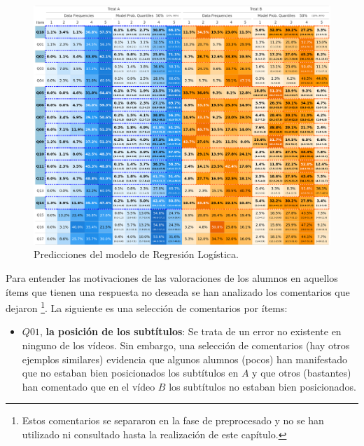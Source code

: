 \documentclass[
  12pt,
  a4paper,
  extrafontsizes,
  onecolumn,
  openright,
  table]{memoir}
\providecommand{\tightlist}{%
  \setlength{\itemsep}{0pt}\setlength{\parskip}{0pt}}\usepackage{longtable,booktabs,array}
\begin{document}
\begin{figure}[h]
\begin{adjustwidth}{-3.4cm}{}

\includegraphics[width=1.2\linewidth]{images/bayes-probs.png} \hfill{}

\caption{\label{fig-prob-compare}Predicciones del modelo de Regresión Logística.}

\end{adjustwidth}
\end{figure}

Para entender las motivaciones de las valoraciones de los alumnos en
aquellos ítems que tienen una respuesta no deseada se han analizado los
comentarios que dejaron \footnote{Estos comentarios se separaron en la
  fase de preprocesado y no se han utilizado ni consultado hasta la
  realización de este capítulo.}. La siguiente es una selección de
comentarios por ítems:

\begin{itemize}
\tightlist
\item
  \(Q01\), \textbf{la posición de los subtítulos}: Se trata de un error
  no existente en ninguno de los vídeos. Sin embargo, una selección de
  comentarios (hay otros ejemplos similares) evidencia que algunos
  alumnos (pocos) han manifestado que no estaban bien posicionados los
  subtítulos en \(A\) y que otros (bastantes) han comentado que en el
  vídeo \(B\) los subtítulos no estaban bien posicionados.
\end{itemize}

\scriptsize
\color{blue}
\end{document}
